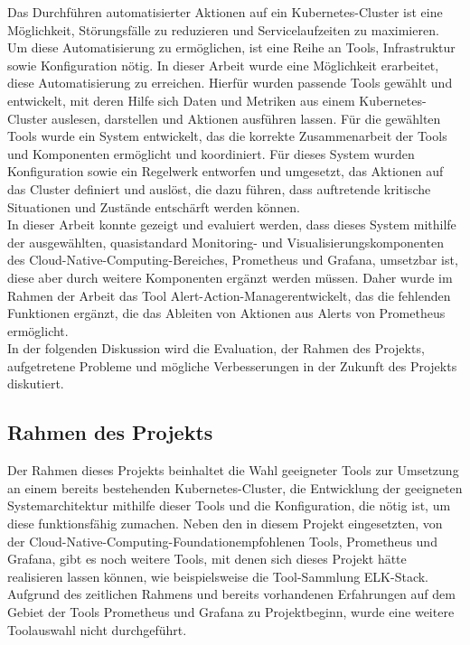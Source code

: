 \documentclass[a4paper,10pt]{scrartcl}
\begin{document}
Das Durchführen automatisierter Aktionen auf ein Kubernetes-Cluster ist eine Möglichkeit, Störungsfälle zu reduzieren und Servicelaufzeiten zu maximieren. Um diese Automatisierung zu ermöglichen, ist eine Reihe an Tools, Infrastruktur sowie Konfiguration nötig. In dieser Arbeit wurde eine Möglichkeit erarbeitet, diese Automatisierung zu erreichen. Hierfür wurden passende Tools gewählt und entwickelt, mit deren Hilfe sich Daten und Metriken aus einem Kubernetes-Cluster auslesen, darstellen und Aktionen ausführen lassen. Für die gewählten Tools wurde ein System entwickelt, das die korrekte Zusammenarbeit der Tools und Komponenten ermöglicht und koordiniert. Für dieses System wurden Konfiguration sowie ein Regelwerk entworfen und umgesetzt, das Aktionen auf das Cluster definiert und auslöst, die dazu führen, dass auftretende kritische Situationen und Zustände entschärft werden können.\\
In dieser Arbeit konnte gezeigt und evaluiert werden, dass dieses System mithilfe der ausgewählten, quasistandard Monitoring- und Visualisierungskomponenten des \glqq Cloud-Native-Computing\grqq -Bereiches, Prometheus und Grafana, umsetzbar ist, diese aber durch weitere Komponenten ergänzt werden müssen. Daher wurde im Rahmen der Arbeit das Tool \glqq Alert-Action-Manager\grqq entwickelt, das die fehlenden Funktionen ergänzt, die das Ableiten von Aktionen aus Alerts von Prometheus ermöglicht. \\
In der folgenden Diskussion wird die Evaluation, der Rahmen des Projekts, aufgetretene Probleme und mögliche Verbesserungen in der Zukunft des Projekts diskutiert.

\subsection{Rahmen des Projekts}

Der Rahmen dieses Projekts beinhaltet die Wahl geeigneter Tools zur Umsetzung an einem bereits bestehenden Kubernetes-Cluster, die Entwicklung der geeigneten Systemarchitektur mithilfe dieser Tools und die Konfiguration, die nötig ist, um diese funktionsfähig zumachen.
Neben den in diesem Projekt eingesetzten, von der \glqq Cloud-Native-Computing-Foundation\grqq empfohlenen Tools, Prometheus und Grafana, gibt es noch weitere Tools, mit denen sich dieses Projekt hätte realisieren lassen können, wie beispielsweise die Tool-Sammlung \glqq ELK\grqq -Stack. Aufgrund des zeitlichen Rahmens und bereits vorhandenen Erfahrungen auf dem Gebiet der Tools Prometheus und Grafana zu Projektbeginn, wurde eine weitere Toolauswahl nicht durchgeführt.
\end{document}
